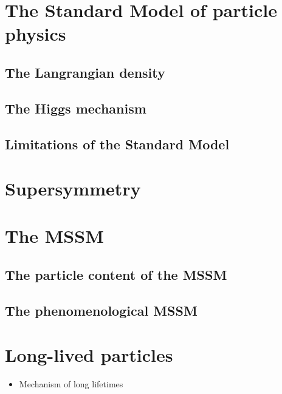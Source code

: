 \section{The Standard Model of particle physics}
\subsection{The Langrangian density}
\subsection{The Higgs mechanism}
\subsection{Limitations of the Standard Model}

\section{Supersymmetry}


\section{The MSSM}
\subsection{The particle content of the MSSM}
\subsection{The phenomenological MSSM}

\section{Long-lived particles}
\begin{itemize}
\item Mechanism of long lifetimes
\end{itemize}
